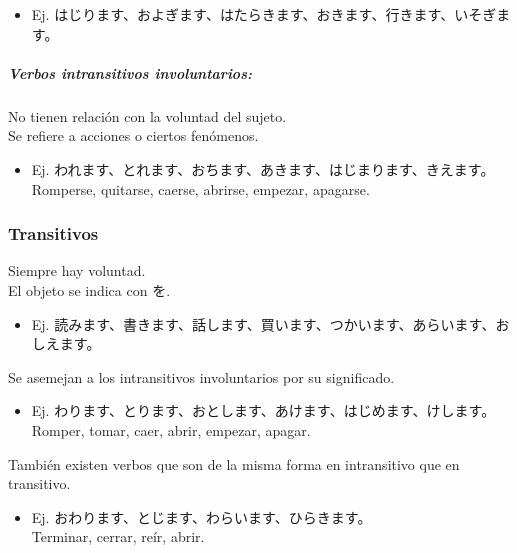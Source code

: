 \documentclass[a4paper,12pt,oneside]{report}
\begin{document}
\begin{CJK*}{UTF8}{min}
            \begin{itemize}
              \item Ej. はじります、およぎます、はたらきます、おきます、行きます、いそぎます。
            \end{itemize}

          \subparagraph{Verbos intransitivos involuntarios:}

            No tienen relación con la voluntad del sujeto.\\
            Se refiere a acciones o ciertos fenómenos.

            \begin{itemize}
              \item Ej. われます、とれます、おちます、あきます、はじまります、きえます。\\
                        Romperse, quitarse, caerse, abrirse, empezar, apagarse.
            \end{itemize}

        \subsubsection{Transitivos}

          Siempre hay voluntad.\\
          El objeto se indica con を.

          \begin{itemize}
            \item Ej. 読みます、書きます、話します、買います、つかいます、あらいます、おしえます。
          \end{itemize}

          Se asemejan a los intransitivos involuntarios por su significado.

          \begin{itemize}
            \item Ej. わります、とります、おとします、あけます、はじめます、けします。\\
                      Romper, tomar, caer, abrir, empezar, apagar.
          \end{itemize}

          También existen verbos que son de la misma forma en intransitivo que en transitivo.

          \begin{itemize}
            \item Ej. おわります、とじます、わらいます、ひらきます。\\
                      Terminar, cerrar, reír, abrir.
          \end{itemize}


\end{CJK*}
\end{document}
